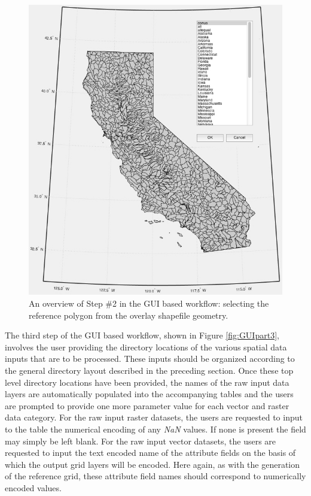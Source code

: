          \begin{figure}[!h]
            \includegraphics[width=5.5in]{figures/gui_fig2.jpg}
            \caption{An overview of Step \#2 in the GUI based workflow: selecting the reference polygon from the overlay shapefile geometry.}
            \label{fig:GUIpart2}
         \end{figure}

The third step of the GUI based workflow, shown in Figure \ref{fig:GUIpart3}, involves the user providing the directory locations of the various spatial data inputs that are to be processed. These inputs should be organized according to the general directory layout described in the preceding section. Once these top level directory locations have been provided, the names of the raw input data layers are automatically populated into the accompanying tables and the users are prompted to provide one more parameter value for each vector and raster data category. For the raw input raster datasets, the users are requested to input to the table the numerical encoding of any \textit{NaN} values. If none is present the field may simply be left blank. For the raw input vector datasets, the users are requested to input the text encoded name of the attribute fields on the basis of which the output grid layers will be encoded. Here again, as with the generation of the reference grid, these attribute field names should correspond to numerically encoded values.


